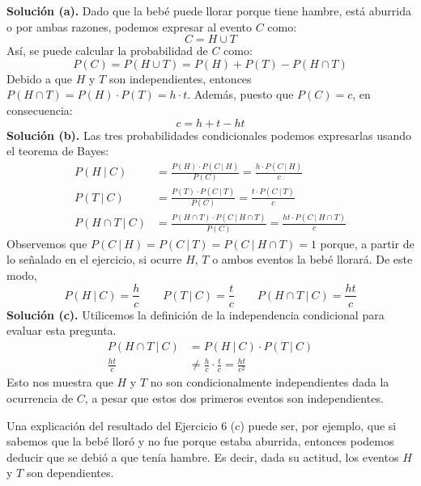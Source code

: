 \documentclass[12pt]{article}
\begin{document}
\textbf{Solución (a).} Dado que la bebé puede llorar porque tiene hambre, está aburrida o por ambas razones, podemos expresar al evento $C$ como:
\[
  C = H \cup T
\]
Así, se puede calcular la probabilidad de $C$ como:
\[
  P(C) = P(H \cup T) = P(H) + P(T) - P(H \cap T)
\]
Debido a que $H$ y $T$ son independientes, entonces $P(H \cap T) = P(H) \cdot P(T) = h \cdot t$. Además, puesto que $P(C) = c$, en consecuencia:
\[
  c = h + t - ht
\]
\textbf{Solución (b).} Las tres probabilidades condicionales podemos expresarlas usando el teorema de Bayes:
\begin{align*}
  P(H \ | \ C) &= \frac{P(H) \cdot P(C \ | \ H)}{P(C)} = \frac{h \cdot P(C \ | \ H)}{c} \\
  P(T \ | \ C) &= \frac{P(T) \cdot P(C \ | \ T)}{P(C)} = \frac{t \cdot P(C \ | \ T)}{c} \\
  P(H \cap T \ | \ C) &= \frac{P(H \cap T) \cdot P(C \ | \ H \cap T)}{P(C)} = \frac{ht \cdot P(C \ | \ H \cap T)}{c}
\end{align*}
Observemos que $P(C \ | \ H) = P(C \ | \ T) = P(C \ | \ H \cap T) = 1$ porque, a partir de lo señalado en el ejercicio, si ocurre $H$, $T$ o ambos eventos la bebé llorará. De este modo,
\[
  P(H \ | \ C) = \frac{h}{c} \qquad
  P(T \ | \ C) = \frac{t}{c} \qquad
  P(H \cap T \ | \ C) = \frac{ht}{c}
\]
\textbf{Solución (c).} Utilicemos la definición de la independencia condicional para evaluar esta pregunta.
\begin{align*}
  P(H \cap T \ | \ C) &= P(H \ | \ C) \cdot P(T \ | \ C) \\
         \frac{ht}{c} &\neq \frac{h}{c} \cdot \frac{t}{c} = \frac{ht}{c^{2}}
\end{align*}
Esto nos muestra que $H$ y $T$ no son condicionalmente independientes dada la ocurrencia de $C$, a pesar que estos dos primeros eventos son independientes.

Una explicación del resultado del Ejercicio 6 (c) puede ser, por ejemplo, que si sabemos que la bebé lloró y no fue porque estaba aburrida, entonces podemos deducir que se debió a que tenía hambre. Es decir, dada su actitud, los eventos $H$ y $T$ son dependientes.
\end{document}

